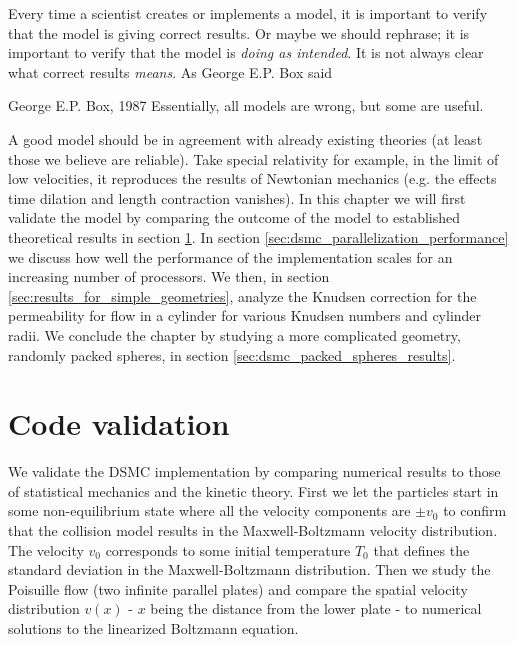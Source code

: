 Every time a scientist creates or implements a model, it is important to verify that the model is giving correct results. Or maybe we should rephrase; it is important to verify that the model is \textit{doing as intended}. It is not always clear what correct results \textit{means}. As George E.P. Box said
\begin{aquote}{George E.P. Box, 1987}
Essentially, all models are wrong, but some are useful.
\end{aquote}
A good model should be in agreement with already existing theories (at least those we believe are reliable). Take special relativity for example, in the limit of low velocities, it reproduces the results of Newtonian mechanics (e.g. the effects time dilation and length contraction vanishes). In this chapter we will first validate the model by comparing the outcome of the model to established theoretical results in section \ref{sec:dsmc_code_validation}. In section \ref{sec:dsmc_parallelization_performance} we discuss how well the performance of the implementation scales for an increasing number of processors. We then, in section \ref{sec:results_for_simple_geometries}, analyze the Knudsen correction for the permeability for flow in a cylinder for various Knudsen numbers and cylinder radii. We conclude the chapter by studying a more complicated geometry, randomly packed spheres, in section \ref{sec:dsmc_packed_spheres_results}.

\section{Code validation}
\label{sec:dsmc_code_validation}
We validate the DSMC implementation by comparing numerical results to those of statistical mechanics and the kinetic theory. First we let the particles start in some non-equilibrium state where all the velocity components are $\pm v_0$ to confirm that the collision model results in the Maxwell-Boltzmann velocity distribution. The velocity $v_0$ corresponds to some initial temperature $T_0$ that defines the standard deviation in the Maxwell-Boltzmann distribution. Then we study the Poisuille flow (two infinite parallel plates) and compare the spatial velocity distribution $v(x)$ - $x$ being the distance from the lower plate - to numerical solutions to the linearized Boltzmann equation.
